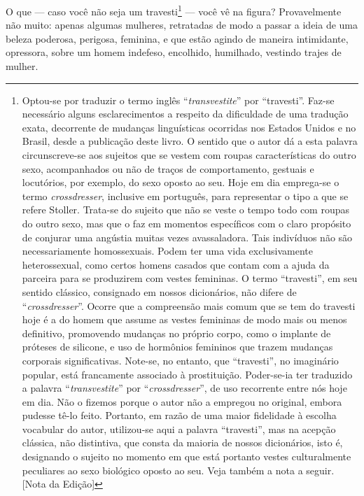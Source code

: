 O que --- caso você não seja um travesti\footnote{ Optou-se por traduzir
o termo inglês ``\textit{transvestite}'' por “travesti”.
Faz-se necessário alguns esclarecimentos a respeito da dificuldade de uma
tradução exata, decorrente de mudanças linguísticas ocorridas nos Estados Unidos
e no Brasil, desde a publicação deste livro. O sentido que o autor dá a esta
palavra circunscreve-se aos sujeitos que se vestem com roupas características do
outro sexo, acompanhados ou não de traços de comportamento, gestuais e
locutórios, por exemplo, do sexo oposto ao seu. Hoje em dia emprega-se o termo
\textit{crossdresser}, inclusive em português, para representar o tipo a que
se refere Stoller. Trata-se do sujeito que não se veste o tempo todo com roupas
do outro sexo, mas que o faz em momentos específicos com o claro propósito de
conjurar uma angústia muitas vezes avassaladora. Tais indivíduos não são
necessariamente homossexuais. Podem ter uma vida exclusivamente heterossexual,
como certos homens casados que contam com a ajuda da parceira para se produzirem
com vestes femininas. O termo “travesti”, em seu sentido clássico, consignado em
nossos dicionários, não difere de “\textit{crossdresser}”. Ocorre que a
compreensão mais comum que se tem do travesti hoje é a do homem que assume as
vestes femininas de modo mais ou menos definitivo, promovendo mudanças no
próprio corpo, como o implante de próteses de silicone, e uso de hormônios
femininos que trazem mudanças corporais significativas. Note-se, no entanto, que
``travesti'', no imaginário popular, está francamente associado à prostituição.
Poder-se-ia ter traduzido a palavra “\textit{transvestite}” por
“\textit{crossdresser}”, de uso recorrente entre nós hoje em dia. Não o fizemos
porque o autor não a empregou no original, embora pudesse tê-lo feito. Portanto,
em razão de uma maior fidelidade à escolha vocabular do autor, utilizou-se aqui
a palavra “travesti”, mas na acepção clássica, não distintiva, que consta da
maioria de nossos dicionários, isto é, designando o sujeito no momento em que
está portanto vestes culturalmente peculiares ao sexo biológico oposto ao seu.
Veja também a nota a seguir. [Nota da Edição]}
 --- você vê na figura?
Provavelmente não muito: apenas algumas mulheres, retratadas de modo a
passar a ideia de uma beleza poderosa, perigosa, feminina, e que estão
agindo de maneira intimidante, opressora, sobre um homem indefeso,
encolhido, humilhado,\idxtravemhumi{} vestindo trajes de mulher.

